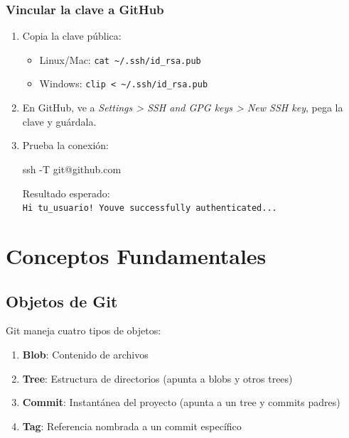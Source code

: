 \documentclass[
  doc,
  floatsintext,
  longtable,
  a4paper,
  nolmodern,
  notxfonts,
  notimes,
  12pt,
  colorlinks=true,linkcolor=blue,citecolor=blue,urlcolor=blue]{apa7}
\newenvironment{Shaded}{\begin{snugshade}}{\end{snugshade}}
\newcommand{\AttributeTok}[1]{\textcolor[rgb]{0.40,0.45,0.13}{#1}}
\newcommand{\FunctionTok}[1]{\textcolor[rgb]{0.28,0.35,0.67}{#1}}
\newcommand{\NormalTok}[1]{\textcolor[rgb]{0.00,0.23,0.31}{#1}}
\providecommand{\tightlist}{%
  \setlength{\itemsep}{0pt}\setlength{\parskip}{0pt}}
\begin{document}
\subsubsection{Vincular la clave a
GitHub}\label{vincular-la-clave-a-github}

\begin{enumerate}
\def\labelenumi{\arabic{enumi}.}
\item
  Copia la clave pública:

  \begin{itemize}
  \tightlist
  \item
    Linux/Mac: \texttt{cat\ \textasciitilde{}/.ssh/id\_rsa.pub}
  \item
    Windows:
    \texttt{clip\ \textless{}\ \textasciitilde{}/.ssh/id\_rsa.pub}
  \end{itemize}
\item
  En GitHub, ve a \emph{Settings \textgreater{} SSH and GPG keys
  \textgreater{} New SSH key}, pega la clave y guárdala.
\item
  Prueba la conexión:

\begin{Shaded}
\begin{Highlighting}[]
\FunctionTok{ssh} \AttributeTok{{-}T}\NormalTok{ git@github.com}
\end{Highlighting}
\end{Shaded}

  Resultado esperado:
  \texttt{Hi\ tu\_usuario!\ You\textquotesingle{}ve\ successfully\ authenticated...}
\end{enumerate}

\section{Conceptos Fundamentales}\label{conceptos-fundamentales}

\subsection{Objetos de Git}\label{objetos-de-git}

Git maneja cuatro tipos de objetos:

\begin{enumerate}
\def\labelenumi{\arabic{enumi}.}
\tightlist
\item
  \textbf{Blob}: Contenido de archivos
\item
  \textbf{Tree}: Estructura de directorios (apunta a blobs y otros
  trees)
\item
  \textbf{Commit}: Instantánea del proyecto (apunta a un tree y commits
  padres)
\item
  \textbf{Tag}: Referencia nombrada a un commit específico
\end{enumerate}
\end{document}
